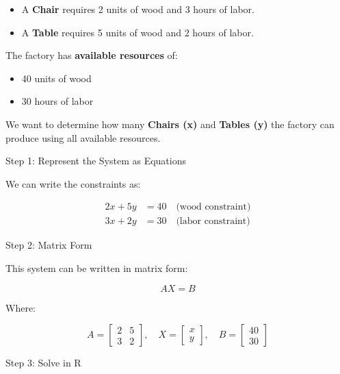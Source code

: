 \documentclass[
  letterpaper,
  DIV=11,
  numbers=noendperiod]{scrartcl}
\providecommand{\tightlist}{%
  \setlength{\itemsep}{0pt}\setlength{\parskip}{0pt}}
\begin{document}
\begin{itemize}
\tightlist
\item
  A \textbf{Chair} requires 2 units of wood and 3 hours of labor.
\item
  A \textbf{Table} requires 5 units of wood and 2 hours of labor.
\end{itemize}

The factory has \textbf{available resources} of:

\begin{itemize}
\tightlist
\item
  40 units of wood
\item
  30 hours of labor
\end{itemize}

We want to determine how many \textbf{Chairs (x)} and \textbf{Tables
(y)} the factory can produce using all available resources.

Step 1: Represent the System as Equations

We can write the constraints as:

\[
\begin{aligned}
2x + 5y &= 40 \quad \text{(wood constraint)} \\
3x + 2y &= 30 \quad \text{(labor constraint)}
\end{aligned}
\]

Step 2: Matrix Form

This system can be written in matrix form:

\[
AX = B
\]

Where:

\[
A = \begin{bmatrix} 2 & 5 \\ 3 & 2 \end{bmatrix}, \quad
X = \begin{bmatrix} x \\ y \end{bmatrix}, \quad
B = \begin{bmatrix} 40 \\ 30 \end{bmatrix}
\]

Step 3: Solve in R
\end{document}
